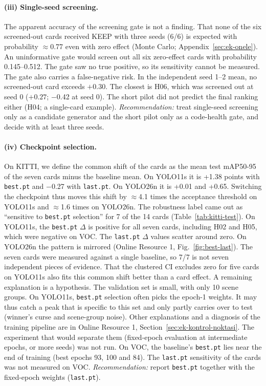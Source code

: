 \documentclass[pdflatex,iicol,sn-mathphys-num]{sn-jnl}
\begin{document}
\paragraph{(iii) Single-seed screening.}
The apparent accuracy of the screening gate is not a finding. That none of the six screened-out cards received KEEP with three seeds (6/6) is expected with probability $\approx$0.77 even with zero effect (Monte Carlo; Appendix~\ref{sec:ek-onele}). An uninformative gate would screen out all six zero-effect cards with probability 0.145--0.512. The gate saw no true positive, so its sensitivity cannot be measured. The gate also carries a false-negative risk. In the independent seed 1--2 mean, no screened-out card exceeds $+0.30$. The closest is H06, which was screened out at seed 0 ($+0.27$; $-$0.42 at seed 0). The short pilot did not predict the final ranking either (H04; a single-card example). \emph{Recommendation:} treat single-seed screening only as a candidate generator and the short pilot only as a code-health gate, and decide with at least three seeds.

\paragraph{(iv) Checkpoint selection.}
On KITTI, we define the common shift of the cards as the mean test mAP50-95 of the seven cards minus the baseline mean. On YOLO11s it is +1.38 points with \texttt{best.pt} and $-$0.27 with \texttt{last.pt}. On YOLO26n it is +0.01 and +0.65. Switching the checkpoint thus moves this shift by $\approx$4.1 times the acceptance threshold on YOLO11s and $\approx$1.6 times on YOLO26n. The robustness label came out as ``sensitive to \texttt{best.pt} selection'' for 7 of the 14 cards (Table~\ref{tab:kitti-test}). On YOLO11s, the \texttt{best.pt} $\Delta$ is positive for all seven cards, including H02 and H05, which were negative on VOC. The \texttt{last.pt} $\Delta$ values scatter around zero. On YOLO26n the pattern is mirrored (Online Resource 1, Fig.~\ref{fig:best-last}). The seven cards were measured against a single baseline, so 7/7 is not seven independent pieces of evidence. That the clustered CI excludes zero for five cards on YOLO11s also fits this common shift better than a card effect. A remaining explanation is a hypothesis. The validation set is small, with only 10 scene groups. On YOLO11s, \texttt{best.pt} selection often picks the epoch-1 weights. It may thus catch a peak that is specific to this set and only partly carries over to test (winner's curse and scene-group noise). Other explanations and a diagnosis of the training pipeline are in Online Resource 1, Section~\ref{sec:ek-kontrol-noktasi}. The experiment that would separate them (fixed-epoch evaluation at intermediate epochs, or more seeds) was not run. On VOC, the baseline's \texttt{best.pt} lies near the end of training (best epochs 93, 100 and 84). The \texttt{last.pt} sensitivity of the cards was not measured on VOC. \emph{Recommendation:} report \texttt{best.pt} together with the fixed-epoch weights (\texttt{last.pt}).
\end{document}
